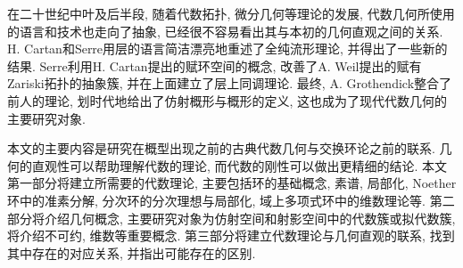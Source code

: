 在二十世纪中叶及后半段, 随着代数拓扑, 微分几何等理论的发展, 代数几何所使用的语言和技术也走向了抽象, 已经很不容易看出其与本初的几何直观之间的关系. H. Cartan和Serre用层的语言简洁漂亮地重述了全纯流形理论, 并得出了一些新的结果. Serre利用H. Cartan提出的赋环空间的概念, 改善了A. Weil提出的赋有Zariski拓扑的抽象簇, 并在上面建立了层上同调理论. 最终, A. Grothendick整合了前人的理论, 划时代地给出了仿射概形与概形的定义, 这也成为了现代代数几何的主要研究对象.

本文的主要内容是研究在概型出现之前的古典代数几何与交换环论之前的联系. 几何的直观性可以帮助理解代数的理论, 而代数的刚性可以做出更精细的结论. 本文第一部分将建立所需要的代数理论, 主要包括环的基础概念, 素谱, 局部化, Noether环中的准素分解, 分次环的分次理想与局部化, 域上多项式环中的维数理论等. 第二部分将介绍几何概念, 主要研究对象为仿射空间和射影空间中的代数簇或拟代数簇, 将介绍不可约, 维数等重要概念. 第三部分将建立代数理论与几何直观的联系, 找到其中存在的对应关系, 并指出可能存在的区别.
